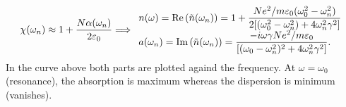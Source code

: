 \begin{align}
    \chi(\omega_n)\approx1+\frac{N\alpha(\omega_n)}{2\varepsilon_0}\Longrightarrow
    \begin{array}{l}
        \displaystyle n(\omega)=\text{Re}\left(\tilde{n}(\omega_n)\right)=
    1+\frac{Ne^2/m\varepsilon_0(\omega_0^2-\omega_n^2)}{2[(\omega_0^2-\omega_n^2)+4\omega_n^2\gamma^2]}\\
        \displaystyle a(\omega_n)=\text{Im}\left(\tilde{n}(\omega_n)\right)=\frac{-i\omega\gamma Ne^2/m\varepsilon_0}{[(\omega_0-\omega_n^2)^2+4\omega_n^2\gamma^2]}.
    \end{array}
\end{align} 
In the curve above both parts are plotted againd the frequency. At $\omega=\omega_0$ (resonance), the absorption is maximum whereas the dispersion is
minimum (vanishes).